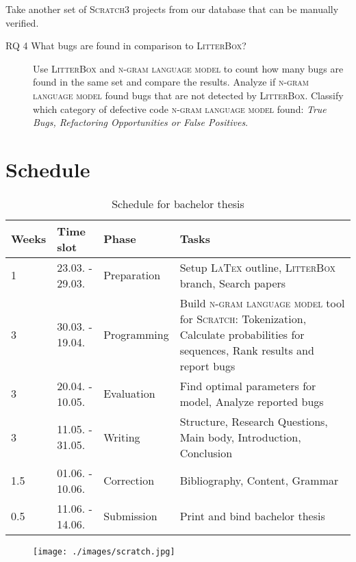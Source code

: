 \documentclass[
    numbers=noenddot,
    parskip=half-,
    fontsize=12pt,
    paper=a4,
    oneside,
    titlepage,
    bibliography=totoc,
    chapterprefix=false,
]{scrbook}
\newcommand{\latex}{\textsc{LaTex}}
\newcommand{\ngram}{\textsc{n-gram language model}}
\newcommand{\litterbox}{\textsc{LitterBox}}
\newcommand{\scratch}{\textsc{Scratch}}
\begin{document}
	Take another set of \scratch{3} projects from our database that can be manually verified.
	
    \begin{description}
        \item[RQ 4 What bugs are found in comparison to \litterbox{}?] 
        Use \litterbox{} and \ngram{} to count how many bugs are found in the same set and compare the results. Analyze if \ngram{} found bugs that are not detected by \litterbox{}. Classify which category of defective code \ngram{} found: \textit{True Bugs, Refactoring Opportunities or False Positives}.
    \end{description}
 
 
 	\chapter{Schedule}\label{ch:schedule}
 	
 	\begin{table}[ht]
 		\label{tab:schedule}
 		\caption{Schedule for bachelor thesis}
 		\begin{tabular}{p{1cm}p{3cm}p{3cm}p{8cm}}
 			Weeks & Time slot & Phase & Tasks \\
 			\hline
 			1 & 23.03. - 29.03. & Preparation & Setup \latex{} outline, \litterbox{} branch, Search papers \\
 			3 & 30.03. - 19.04. & Programming & Build \ngram{} tool for \scratch{}: Tokenization, Calculate probabilities for sequences, Rank results and report bugs\\
 			3 & 20.04. - 10.05. & Evaluation & Find optimal parameters for model, Analyze reported bugs\\
 			3 & 11.05. - 31.05. & Writing & Structure, Research Questions, Main body, Introduction, Conclusion \\
 			1.5 & 01.06. - 10.06. & Correction & Bibliography, Content, Grammar \\
 			0.5 & 11.06. - 14.06. & Submission & Print and bind bachelor thesis\\
 			\hline
 		\end{tabular}
 	\end{table}
 
 	\begin{figure}
 		\centering
 		\texttt{[image: ./images/scratch.jpg]}
 	\end{figure}


    \backmatter

    \printbibliography
    
\end{document}
